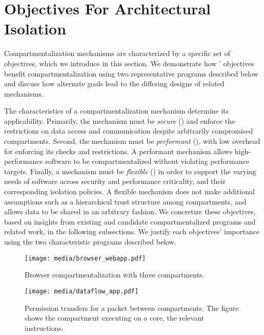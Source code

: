 \section{Objectives For Architectural Isolation}
\label{sec:reqs}

Compartmentalization mechanisms are characterized by a specific set of 
objectives, which we introduce in this section.
We demonstrate how \seccells' objectives benefit compartmentalization
using two representative programs described below and
discuss how alternate goals lead to the differing designs
of related mechanisms.

The characteristics of a compartmentalization mechanism 
determine its applicability.
Primarily, the mechanism must be \emph{secure} () 
and enforce the
restrictions on data access and communication despite arbitrarily compromised
compartments. 
Second, the mechanism must be \emph{performant} (), 
with low overhead for enforcing its checks and restrictions.
A performant mechanism allows high-performance software
to be compartmentalized without violating performance targets.
Finally, a mechanism must be \emph{flexible} () in order to 
support the varying needs of software across security and 
performance criticality, and their corresponding isolation policies.
A flexible mechanism does not make additional assumptions such as
a hierarchical trust structure among compartments, and allows
data to be shared in an arbitrary fashion.
We concretize these objectives, based on insights from existing
and candidate compartmentalized programs and related work, 
in the following subsections.
We justify each objectives' importance using the
two characteristic programs described below.

\begin{figure}
  \centering
  \texttt{[image: media/browser\_webapp.pdf]}
  \caption{Browser compartmentalization with three compartments.}
  \label{fig:browser_eg}
  \texttt{[image: media/dataflow\_app.pdf]}
  \caption{Permission transfers for a packet between \seccells compartments. 
            The figure shows the compartment executing on a core, the 
            relevant \seccells instructions.}
  \label{fig:dataflow_app}
\end{figure}

